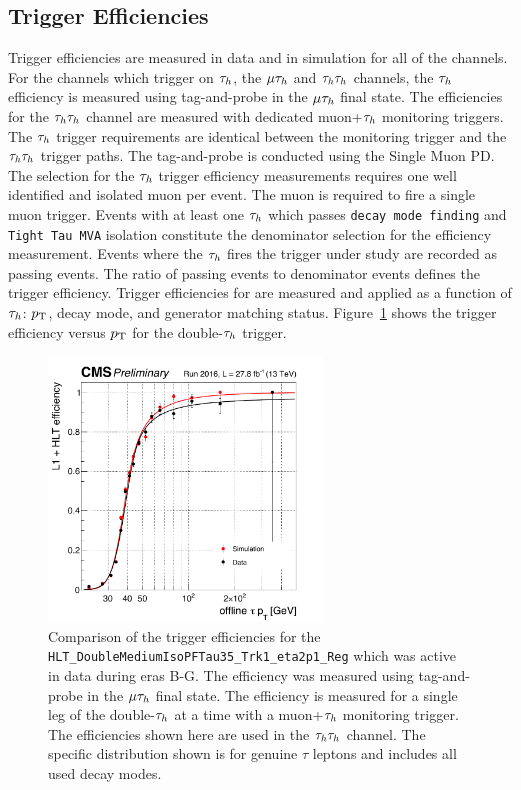 \subsection{Trigger Efficiencies}
\label{sec:htt_trigger_eff}
Trigger efficiencies are measured in data and in simulation for all of the channels. For the channels
which trigger on $\tau_{h}$, the $\mu\tau_{h}$ and $\tau_{h}\tau_{h}$ channels, the $\tau_{h}$ efficiency is measured
using tag-and-probe in the $\mu\tau_{h}$ final state. The efficiencies for the $\tau_{h}\tau_{h}$ channel
are measured with dedicated muon+$\tau_{h}$ monitoring triggers. The $\tau_{h}$ trigger requirements
are identical between the monitoring trigger and the $\tau_{h}\tau_{h}$ trigger paths. The tag-and-probe
is conducted using the Single Muon PD. The selection for the $\tau_{h}$ trigger efficiency measurements 
requires one well identified and isolated muon per event. The muon is required to fire a single muon trigger.
Events with at least one $\tau_{h}$ which passes \texttt{decay mode finding} and \texttt{Tight Tau MVA} isolation
constitute the denominator selection for the efficiency measurement. Events where the $\tau_{h}$
fires the trigger under study are recorded as passing events. The ratio of passing events to
denominator events defines the trigger efficiency. Trigger efficiencies for are measured and applied as 
a function of $\tau_{h}$: $p_\mathrm{T}$, decay mode, and generator matching status. Figure~\ref{fig:htt_tt_trig}
shows the trigger efficiency versus $p_\mathrm{T}$ for the double-$\tau_{h}$ trigger.

\begin{figure}[!htbp]
\centering
     \includegraphics[width=0.65\textwidth]{higgs_to_taus/plots/htt_tautau_trigger_efficiency.pdf}
     \caption{
Comparison of the trigger efficiencies for the \texttt{HLT\_DoubleMediumIsoPFTau35\_Trk1\_eta2p1\_Reg}
which was active in data during eras B-G. The efficiency was measured using tag-and-probe in the
$\mu\tau_{h}$ final state. The efficiency is measured for a single leg of the double-$\tau_{h}$ at a time
with a muon+$\tau_{h}$ monitoring trigger. The efficiencies shown here are used in the $\tau_{h}\tau_{h}$ channel.
The specific distribution shown is for genuine $\tau$ leptons and includes all used decay modes.
}
     \label{fig:htt_tt_trig}
\end{figure}

